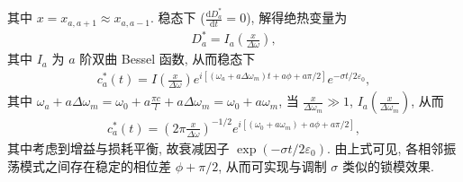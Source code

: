 \documentclass{note}
\begin{document}
\begin{sol}
    其中 $x=x_{a,a+1}\approx x_{a,a-1}$.
    稳态下 ($\frac{\mathrm{d}D_a^*}{\mathrm{d}t}=0$), 解得绝热变量为
    \begin{align}
        D_a^*=I_a\left(\frac{x}{\Delta\omega}\right),
    \end{align}
    其中 $I_a$ 为 $a$ 阶双曲 Bessel 函数, 从而稳态下
    \begin{align}
        c_a^*(t)=I\left(\frac{x}{\Delta\omega}\right)e^{i[(\omega_a+a\Delta\omega_m)t+a\phi+a\pi/2]}e^{-\sigma t/2\varepsilon_0},
    \end{align}
    其中 $\omega_a+a\Delta\omega_m=\omega_0+a\frac{\pi c}{l}+a\Delta\omega_m=\omega_0+a\omega_m$, 当 $\frac{x}{\Delta\omega_m}\gg 1$, $I_a\left(\frac{x}{\Delta\omega_m}\right)$, 从而
    \begin{align}
        c_a^*(t)=\left(2\pi\frac{x}{\Delta\omega}\right)^{-1/2}e^{i[(\omega_0+a\omega_m)+a\phi+a\pi/2]},
    \end{align}
    其中考虑到增益与损耗平衡, 故衰减因子 $\exp(-\sigma t/2\varepsilon_0)$.
    由上式可见, 各相邻振荡模式之间存在稳定的相位差 $\phi+\pi/2$, 从而可实现与调制 $\sigma$ 类似的锁模效果.
\end{sol}
\ifx\allfiles\undefined
\end{document}
